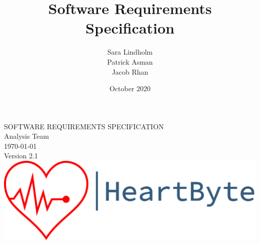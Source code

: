 \documentclass{scrreprt}
\title{Software Requirements Specification}
\author{Sara Lindholm \\ Patrick Asman \\ Jacob Rhan}
\date{October 2020}
\def\myversion{2.1}
\begin{document}
\begin{titlepage}
    \begin{center}
    \begin{bfseries}
        \Huge{SOFTWARE REQUIREMENTS SPECIFICATION}\\
        \vspace{1.5cm}
        \LARGE Analysis Team \\
        \vspace{1.5cm}
        \today\\
        \vspace{1.5cm}
        {Version \myversion}\\
        \vfill
        \includegraphics[width=\linewidth]{Pictures/logo.png} \\
    \end{bfseries}
    \end{center}
\end{titlepage}
\end{document}
